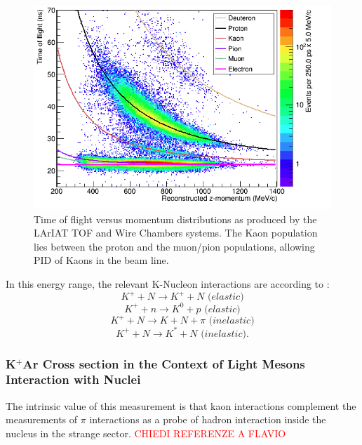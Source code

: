 \begin{figure}[hpbt]
\centering
\includegraphics[width=5in]{images/Lariat/KaonTOF}
\caption{Time of flight versus momentum distributions as produced by the LArIAT TOF and Wire Chambers systems. The Kaon population lies between the proton and the muon/pion populations, allowing PID of Kaons in the beam line.  }
\label{fig:TOFK}
\end{figure}

In this energy range, the relevant K-Nucleon interactions are according to \cite{fesbach1992theoretical}:
\begin{equation}
K^{+} + N \rightarrow K^{+} + N\textit{ (elastic)}
\end{equation}
\begin{equation}K^{+} + n \rightarrow K^{0} + p\textit{ (elastic)}\end{equation}
\begin{equation}K^{+} + N \rightarrow K + N + \pi \textit{ (inelastic)}\end{equation}
\begin{equation}K^{+} + N \rightarrow K^{*} + N\textit{ (inelastic)}.\end{equation}



\subsubsection{K$^{+}$Ar Cross section in the Context of Light Mesons Interaction with Nuclei}
\label{sec:theoryStrangeMeson}
The intrinsic value of this measurement is that kaon interactions complement the measurements of $\pi$ interactions as a probe of  hadron interaction inside the nucleus in the strange sector.  
\textcolor{red}{CHIEDI REFERENZE A FLAVIO}

